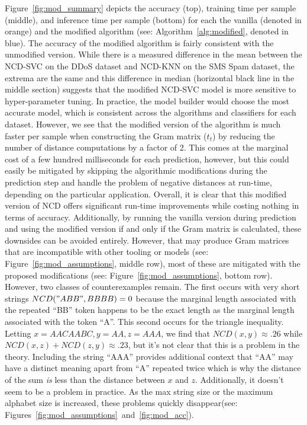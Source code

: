 \documentclass[conference]{IEEEtran}
\begin{document}
Figure~\ref{fig:mod_summary} depicts the accuracy (top), training time per sample (middle), and inference time per sample (bottom) for each the vanilla (denoted in orange) and the modified algorithm (see: Algorithm~\ref{alg:modified}, denoted in blue). 
The accuracy of the modified algorithm is fairly consistent with the unmodified version. 
While there is a measured difference in the mean between the NCD-SVC on the DDoS dataset and NCD-KNN on the SMS Spam dataset, the extrema are the same and this difference in median (horizontal black line in the middle section) suggests that the modified NCD-SVC model is more sensitive to hyper-parameter tuning. 
In practice, the model builder would choose the most accurate model, which is consistent across the algorithms and classifiers for each dataset. However, we see that the modified version of the algorithm is much faster per sample when constructing the Gram matrix ($t_t$) by reducing the number of distance computations by a factor of 2. 
This comes at the marginal cost of a few hundred milliseconds for each prediction, however, but this could easily be mitigated by skipping the algorithmic modifications during the prediction step and handle the problem of negative distances at run-time, depending on the particular application. 
Overall, it is clear that this modified version of NCD offers significant run-time improvements while costing nothing in terms of accuracy. 
Additionally, by running the vanilla version during prediction and using the modified version if and only if the Gram matrix is calculated, these downsides can be avoided entirely. 
However, that may produce Gram matrices that are incompatible with other tooling or models (see: Figure~\ref{fig:mod_assumptions}, middle row), most of these are mitigated with the proposed modifications (see: Figure~\ref{fig:mod_assumptions}, bottom row). 
However, two classes of counterexamples remain. 
The first occurs with very short strings
$NCD("ABB", BBBB) =0$ because the marginal length associated with the repeated ``BB'' token happens to be the exact length as the marginal length associated with the token ``A''. 
This second occurs for the triangle inequality. 
Letting $x =AACAABC, y = AA,
z=AAA$, we find that $NCD(x,y) \approx .26$ while $NCD(x,z) + NCD(z,y) \approx .23$, but it's not clear that this is a problem in the theory. Including the string ``AAA'' provides additional context that ``AA'' may have a distinct meaning apart from ``A'' repeated twice which is why the distance of the sum \textit{is} less than the distance between $x$ and $z$. Additionally, it doesn't seem to be a problem in practice. 
As the max string size or the maximum alphabet size is increased, these problems quickly disappear(see: Figures~\ref{fig:mod_assumptions}~and~\ref{fig:mod_acc}).
\end{document}
